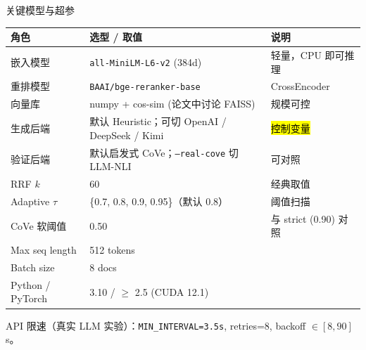 \begin{frame}{关键模型与超参}
  \footnotesize
  \centering
  \begin{tabular}{@{}lll@{}}
    \toprule
    \rowcolor{ZjuBlue!10}
    \textbf{角色} & \textbf{选型 / 取值} & \textbf{说明} \\ \midrule
    嵌入模型     & \texttt{all-MiniLM-L6-v2} (384d) & 轻量，CPU 即可推理 \\
    重排模型     & \texttt{BAAI/bge-reranker-base}  & CrossEncoder \\
    向量库       & numpy + cos-sim (论文中讨论 FAISS) & 规模可控 \\
    生成后端     & 默认 Heuristic；可切 OpenAI / DeepSeek / Kimi & \hl{控制变量} \\
    验证后端     & 默认启发式 CoVe；\texttt{--real-cove} 切 LLM-NLI & 可对照 \\ \midrule
    RRF $k$           & 60        & 经典取值 \\
    Adaptive $\tau$   & \{0.7, 0.8, 0.9, 0.95\}（默认 0.8） & 阈值扫描 \\
    CoVe 软阈值       & 0.50      & 与 strict (0.90) 对照 \\
    Max seq length    & 512 tokens & \\
    Batch size        & 8 docs    & \\
    Python / PyTorch  & 3.10 / $\ge$ 2.5 (CUDA 12.1) & \\
    \bottomrule
  \end{tabular}

  \vspace{0.6em}
  \footnotesize\color{SoftGray}
  API 限速（真实 LLM 实验）：\texttt{MIN\_INTERVAL=3.5s}, retries=8, backoff $\in [8, 90]$s。
\end{frame}
